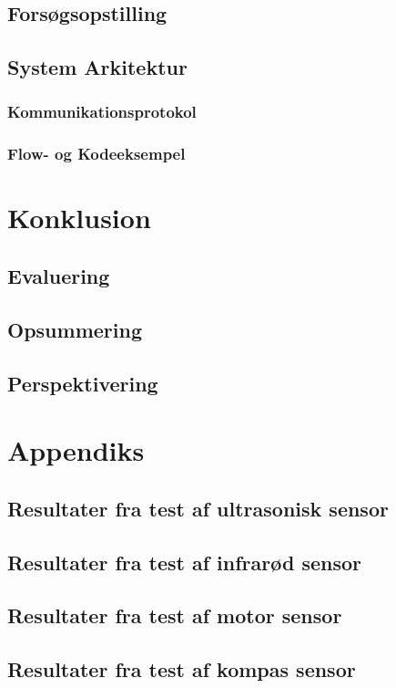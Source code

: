 \chapter{Forsøgsopstilling}

\chapter{System Arkitektur}

\section{Kommunikationsprotokol}\label{kommunikation}

\section{Flow- og Kodeeksempel}


\part{Konklusion}
\chapter{Evaluering}
\chapter{Opsummering}
\chapter{Perspektivering}


\appendix
\part{Appendiks}
\chapter{Resultater fra test af ultrasonisk sensor}

\chapter{Resultater fra test af infrarød sensor}

\chapter{Resultater fra test af motor sensor}

\chapter{Resultater fra test af kompas sensor}




